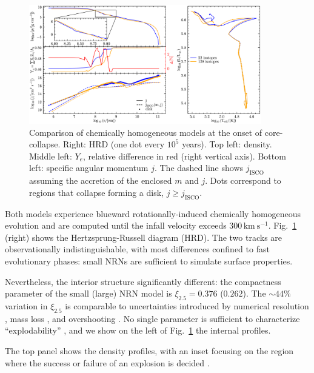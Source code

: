 \documentclass[twocolumn]{aastex63}
\DeclareRobustCommand{\Figref}[1]{Fig.~\ref{#1}}
\begin{document}
\begin{figure}[htbp]
  \centering
  \includegraphics[width=0.9\textwidth]{comparison}
  \caption{Comparison of chemically homogeneous models at the onset of
    core-collapse. Right: HRD (one dot every $10^5$ years).
    Top left: density. Middle left: $Y_e$, relative difference in red
    (right vertical axis). Bottom left: specific angular momentum $j$.
    The dashed line shows $j_\mathrm{ISCO}$ assuming the
    accretion of the enclosed $m$ and $j$. Dots correspond to regions
    that collapse forming a disk, $j\geq j_\mathrm{ISCO}$.}
  \label{fig:comparison}
\end{figure}

Both models experience blueward rotationally-induced chemically
homogeneous evolution \citep[e.g.,][]{maeder:00} and are computed
until the infall velocity exceeds $300\,\mathrm{km\
  s^{-1}}$.
\Figref{fig:comparison} (right) shows the Hertzsprung-Russell diagram
(HRD). The two tracks are observationally indistinguishable, with most
differences confined to fast evolutionary phases: small NRNs are
sufficient to simulate surface properties.

Nevertheless, the interior structure
significantly different:
the compactness parameter \citep{oconnor:11} of the small (large) NRN
model is $\xi_{2.5}=0.376$ ($0.262$). The $\sim{}44\%$ variation in
$\xi_{2.5}$ is comparable to uncertainties introduced by numerical
resolution \citep{farmer:16}, mass loss \citep{renzo:17}, and
overshooting \citep{davis:19}. No single parameter is
sufficient to characterize ``explodability''
\citep[e.g.,][]{ertl:16, vartanyan:21}, and we show on the left
of \Figref{fig:comparison} the internal profiles.

The top panel shows the density profiles, with an inset focusing on
the region where the success or failure of an explosion is decided
\citep[e.g.,][]{ertl:16, boccioli:23, burrows:23}.
\end{document}

